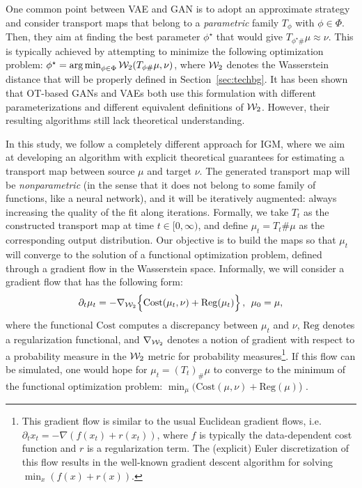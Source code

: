 One common point between VAE and GAN is to adopt an approximate strategy and consider transport maps that belong to a \emph{parametric} family $T_{\phi}$ with $\phi \in \Phi$. Then, they aim at finding the best parameter $\phi^\star$ that would give $T_{\phi^\star \#}\mu \approx \nu$. This is typically achieved by attempting to minimize the following optimization problem:
$\phi^\star = \operatorname*{arg\min}_{\phi \in \Phi} {\cal W}_2(T_{\phi \#}\mu, \nu)$,
where ${\cal W}_2$ denotes the Wasserstein distance that will be properly defined in Section~\ref{sec:techbg}. It has been shown that \cite{genevay2017gan} OT-based GANs \cite{arjovsky2017wasserstein} and VAEs \cite{tolstikhin2017wasserstein} both use this formulation with different parameterizations and different equivalent definitions of ${\cal W}_2$. However, their resulting algorithms still lack theoretical understanding.


In this study, we follow a completely different approach for IGM, where we aim at developing an algorithm with explicit theoretical guarantees for estimating a transport map between source $\mu$ and target $\nu$. The generated transport map  will be \textit{nonparametric} (in the sense that it does not belong to some family of functions, like a neural network), and it will be iteratively augmented: always increasing the quality of the fit along iterations. Formally, we take $T_t$ as the constructed transport map at time $t \in [0,\infty)$, and define $\mu_t=T_t \# \mu$ as the corresponding output distribution. Our objective is to build the maps so that $\mu_t$ will converge to the solution of a functional optimization problem, defined through a gradient flow in the Wasserstein space. Informally, we will consider a gradient flow that has the following form:
\begin{align}
\partial_t \mu_t = - \nabla_{{\cal W}_2} \Bigl\{ \mathrm{Cost}(\mu_t, \nu) + \mathrm{Reg}(\mu_t)\Bigr\} \, , \>\> \mu_0 = \mu,\label{eqn:gradflow}
\end{align}
where the functional $\mathrm{Cost}$ computes a discrepancy between $\mu_t$ and $\nu$, $\mathrm{Reg}$ denotes a regularization functional, and $\nabla_{{\cal W}_2}$ denotes a notion of gradient with respect to a probability measure in the ${\cal W}_2$ metric for probability measures\footnote{This gradient flow is similar to the usual Euclidean gradient flows, i.e.\ $\partial_t x_t = - \nabla (f(x_t) + r(x_t))$, where $f$ is typically the data-dependent cost function and $r$ is a regularization term. The (explicit) Euler discretization of this flow results in the well-known gradient descent algorithm for solving $\min_x (f(x)+r(x))$.}. If this flow can be simulated, one would hope for $\mu_t=(T_t)_{\#}\mu$ to converge to the minimum of the functional optimization problem: $\min_\mu ( \mathrm{Cost}(\mu, \nu) + \mathrm{Reg}(\mu)$) \cite{ambrosio2008gradient,santambrogio2017euclidean}.


